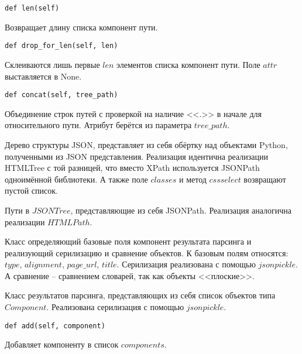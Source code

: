 \begin{lstlisting}
def len(self)
\end{lstlisting}
Возвращает длину списка компонент пути.
\\

\begin{lstlisting}
def drop_for_len(self, len)
\end{lstlisting}
Склеиваются лишь первые $len$ элементов списка компонент пути. Поле $attr$ выставляется в None.
\\

\begin{lstlisting}
def concat(self, tree_path)
\end{lstlisting}
Объединение строк путей с проверкой на наличие <<.>> в начале для относительного пути. Атрибут берётся из параметра $tree\_path$.
\\


Дерево структуры JSON, представляет из себя обёртку над объектами Python, полученными из JSON представления. Реализация идентична реализации HTMLTree с той разницей, что вместо XPath используется JSONPath одноимённой библиотеки. А также поле $classes$ и метод $cssselect$ возвращают пустой список.
\\


Пути в $JSONTree$, представляющие из себя JSONPath. Реализация аналогична реализации $HTMLPath$.
\\


Класс определяющий базовые поля компонент результата парсинга и реализующий серилизацию и сравнение объектов. К базовым полям относятся: $type$, $alignment$, $page\_url$, $title$. Серилизация реализована с помощью $jsonpickle$. А сравнение -- сравнением словарей, так как объекты <<плоские>>.
\\


Класс результатов парсинга, представляющих из себя список объектов типа $Component$. Реализована серилизация с помощью $jsonpickle$.
\\

\begin{lstlisting}
def add(self, component)
\end{lstlisting}
Добавляет компоненту в список $components$.
\\

